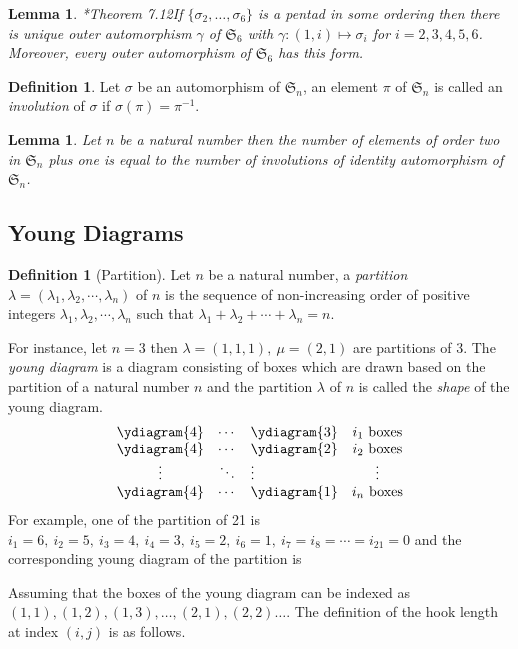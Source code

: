 \documentclass[oneside]{amsart}
\theoremstyle{plain}
\newtheorem{lemma}[theorem]{Lemma} %
\theoremstyle{definition}
\newtheorem{definition}[theorem]{Definition} %
\theoremstyle{remark}
\begin{document}
    \begin{lemma}\cite{MR1307623}*{Theorem 7.12}\label{all_outer_automorphisms_forms_of_S6}
        If $\{\sigma_2, \ldots, \sigma_6\}$ is a pentad in some ordering then there is unique outer automorphism $\gamma$ of $\mathfrak{S}_6$ with $\gamma : (1, i) \mapsto \sigma_i$ for $i = 2, 3, 4, 5, 6$. Moreover, every outer automorphism of $\mathfrak{S}_6$ has this form.
    \end{lemma}
    \begin{definition}
        Let $\sigma$ be an automorphism of $\mathfrak{S}_n$, an element $\pi$ of $\mathfrak{S}_n$ is called an \emph{involution} of $\sigma$ if $\sigma(\pi) = \pi^{-1}$.
    \end{definition}
    \begin{lemma}\label{identity_automorphism_involutions}
        Let $n$ be a natural number then the number of elements of order two in $\mathfrak{S}_n$ plus one is equal to the number of involutions of identity automorphism of $\mathfrak{S}_n$.
    \end{lemma}
    \subsection{Young Diagrams}
    \begin{definition}[Partition]
        Let $n$ be a natural number, a \emph{partition} $\lambda = (\lambda_1, \lambda_2, \cdots, \lambda_n )$ of $n$ is the sequence of non-increasing order of positive integers $\lambda_1, \lambda_2, \cdots, \lambda_n$ such that $\lambda_1 + \lambda_2+ \cdots + \lambda_n = n$.
    \end{definition}
    
    For instance, let $n = 3$ then $\lambda = (1, 1, 1),\ \mu = (2, 1)$ are partitions of $3$. The \emph{young diagram} is a diagram consisting of boxes which are drawn based on the partition of a natural number $n$ and the partition $\lambda$ of $n$ is called the \emph{shape} of the young diagram.
   \begin{align*}
       \begin{array}{c c l c}
        \ydiagram{4} & \cdots &\ydiagram{3} & i_1 \text{ boxes}\\
        \ydiagram{4} & \cdots &\ydiagram{2} & i_2 \text{ boxes}\\
        \vdots & \ddots & \vdots & \vdots\\
        \ydiagram{4} & \cdots & \ydiagram{1}& i_n \text{ boxes}
        \end{array}
   \end{align*}
    For example, one of the partition of 21 is $i_1 = 6,\ i_2 = 5,\ i_3 = 4,\ i_4 = 3,\ i_5 = 2,\ i_6 = 1,\ i_7 = i_8 = \cdots = i_{21} = 0$ and the corresponding young diagram of the partition is
    \begin{center}
    \end{center}
    Assuming that the boxes of the young diagram can be indexed as $(1, 1), (1,2), (1,3), \ldots, (2, 1), (2,2) \ldots$. The definition of the hook length at index $(i, j)$ is as follows.
    
\end{document}
